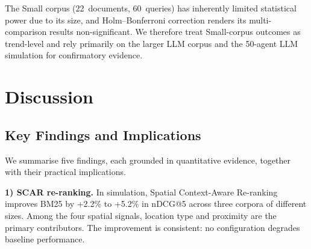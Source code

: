 \documentclass[journal]{IEEEtran}
\begin{document}
\begin{table}[htbp]
\centering
\caption{Holm--Bonferroni correction on the Small corpus (5~comparisons vs.\ BM25).}
\label{tab:holm}
\end{table}

The Small corpus (22~documents, 60~queries) has inherently limited statistical power due to its size, and Holm--Bonferroni correction renders its multi-comparison results non-significant. We therefore treat Small-corpus outcomes as trend-level and rely primarily on the larger LLM corpus and the 50-agent LLM simulation for confirmatory evidence.

\section{Discussion}
\label{sec:discussion}

\subsection{Key Findings and Implications}
\label{subsec:contributions}

We summarise five findings, each grounded in quantitative evidence, together with their practical implications.

\textbf{1) SCAR re-ranking.}
In simulation, Spatial Context-Aware Re-ranking improves BM25 by +2.2\% to +5.2\% in nDCG@5 across three corpora of different sizes.
Among the four spatial signals, location type and proximity are the primary contributors.
The improvement is consistent: no configuration degrades baseline performance.
\end{document}
